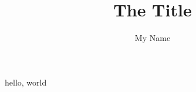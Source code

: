 \documentclass{article}
\author{My Name}
\title{The Title}
\begin{document}
\maketitle
hello, world %
\end{document}
